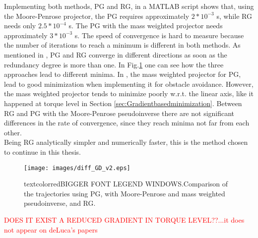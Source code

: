 Implementing both methods, PG and RG, in a MATLAB script shows that, using the Moore-Penrose projector, the PG  requires approximately $2*10^{-3}$ s, while RG  needs only $2.5*10^{-4}$ s. The PG with the mass weighted projector needs approximately $3*10^{-3}$ s. The speed of convergence is hard to measure because the number of iterations to reach a minimum is different in both methods.
As mentioned in \cite{reduced_gradient}, PG and RG converge in different directions as soon as the redundancy degree is more than one. In Fig.\ref{fig:diff_GD_v2} one can see how the three approaches lead to different minima.  In \cite{Nemec_2}, the mass weighted projector for PG, lead to good minimization when implementing it for obstacle avoidance. 
However, the mass weighted projector tends to minimize poorly w.r.t. the linear axis, like it happened at torque level in Section \ref{sec:Gradientbasedminimization}.  Between RG and PG with the Moore-Penrose pseudoinverse there are not significant differences in the rate of convergence, since they reach minima not far from each other.  \\ 
Being RG analytically simpler and numerically faster, this is the method chosen to continue in this thesis. 


\begin{figure}[!htb]
	\centerline{
		\texttt{[image: images/diff\_GD\_v2.eps]}}
	\caption{textcolor{red}{BIGGER FONT LEGEND WINDOWS.}Comparison of the trajectories using PG, with Moore-Penrose and mass weighted pseudoinverse, and RG.}
	\label{fig:diff_GD_v2}
\end{figure}




\textcolor{red}{DOES IT EXIST A REDUCED GRADIENT IN TORQUE LEVEL??...it does not appear on deLuca's papers}






%




